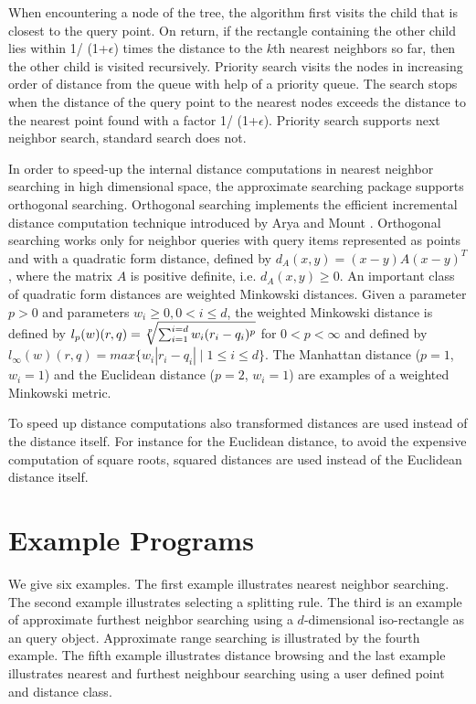 When encountering a node of the tree, the algorithm first visits the child that is closest
to the query point. On return, if the rectangle containing  the other child lies within
1/ (1+$\epsilon$) times the distance to the $k$th nearest neighbors so far, then
the other child is visited recursively.
Priority search \cite{am-annqf-93} visits the nodes in increasing order of distance from
the queue with help of a priority queue.
The search stops when the distance of the query point to the nearest nodes
exceeds the distance to the nearest point found with a factor 1/ (1+$\epsilon$).
Priority search supports next neighbor search, standard search does not.

In order to speed-up the internal distance computations in nearest neighbor searching
in high dimensional space, the approximate searching package supports orthogonal searching. Orthogonal
searching implements the efficient incremental distance computation
technique introduced by Arya and Mount \cite{am-afvq-93}.
Orthogonal searching works only for neighbor queries with query items represented as
points and with a quadratic form distance, defined by $d_A(x,y)= (x-y)A(x-y)^T$, where the matrix
$A$ is positive definite, i.e. $d_A(x,y) \geq 0$. 
An important class of quadratic form distances are weighted Minkowski distances.
Given a parameter $p>0$ and parameters $w_i \geq 0, 0 < i \leq d$, the weighted 
Minkowski distance is defined by  $l_p(w)(r,q)=\root p\of {\sum_{i=1}^{i=d} w_i(r_i-q_i)^p}$ for $0 < p <\infty$ and
defined by $l_{\infty}(w)(r,q)=max \{w_i |r_i-q_i| \mid 1 \leq i \leq d\}$.
The Manhattan distance ($p=1$, $w_i=1$) and the
Euclidean distance ($p=2$, $w_i=1$) are examples of a weighted Minkowski metric.

To speed up distance computations also transformed
distances are used instead of the distance itself. 
For instance for the Euclidean distance, to avoid the expensive computation
of square roots, squared distances are used instead of the Euclidean distance itself. 


\section{Example Programs}

We give six examples. 
The first example illustrates nearest neighbor searching.
The second example illustrates selecting a splitting rule.
The third is an example of approximate furthest neighbor searching using a $d$-dimensional
iso-rectangle as an query object.
Approximate range
searching is illustrated by the fourth example.
The fifth example illustrates distance browsing and the last example illustrates 
nearest and furthest neighbour searching using
a user defined point and distance class.


